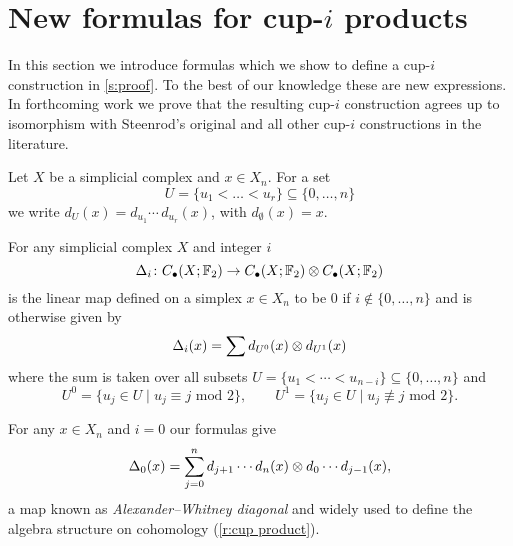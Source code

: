 
\section{New formulas for cup-\texorpdfstring{$i$}{i} products} \label{s:formulas}

In this section we introduce formulas which we show to define a cup-$i$ construction in \cref{s:proof}.
To the best of our knowledge these are new expressions.
In forthcoming work \cite{medina2022axiomatic} we prove that the resulting cup-$i$ construction agrees up to isomorphism with Steenrod's original and all other cup-$i$ constructions in the literature.

\begin{notation}
	Let $X$ be a simplicial complex and $x \in X_n$.
	For a set
	\begin{equation*}
	U = \{u_1 < \dots < u_r\} \subseteq \{0, \dots, n\}
	\end{equation*}
	we write $d_U(x) = d_{u_1}\! \dotsm \, d_{u_r}(x)$, with $d_{\emptyset}(x) = x$.
\end{notation}

\begin{definition} \label{d:cup-i coproducts}
	For any simplicial complex $X$ and integer $i$
	\begin{equation*}
	\Delta_i \colon C_\bullet(X; {\mathbb{F}_2}) \to C_\bullet(X; {\mathbb{F}_2}) \otimes C_\bullet(X; {\mathbb{F}_2})
	\end{equation*}
	is the linear map defined on a simplex $x \in X_n$ to be $0$ if $i \not\in \{0, \dots, n\}$ and is otherwise given by
	\begin{equation} \label{e:new formulas}
	\Delta_i(x) = \sum d_{U^0}(x) \otimes d_{U^1}(x)
	\end{equation}
	where the sum is taken over all subsets $U = \{u_1 < \cdots < u_{n-i}\} \subseteq \{0, \dots, n\}$ and
	\begin{equation} \label{e:partition subsets}
	U^0 = \{u_j \in U\mid u_j \equiv j \text{ mod } 2\}, \qquad
	U^1 = \{u_j \in U\mid u_j \not\equiv j \text{ mod } 2\}.
	\end{equation}
\end{definition}

\begin{example} \label{ex:alexander-whitney diagonal}
	For any $x \in X_n$ and $i = 0$ our formulas give
	\begin{equation*}
	\Delta_0(x) = \sum_{j=0}^n d_{j+1} \cdots d_{n}(x) \otimes d_{0} \cdots d_{j-1}(x),
	\end{equation*}
	a map known as \textit{Alexander--Whitney diagonal} and widely used to define the algebra structure on cohomology (\cref{r:cup product}).
\end{example}

